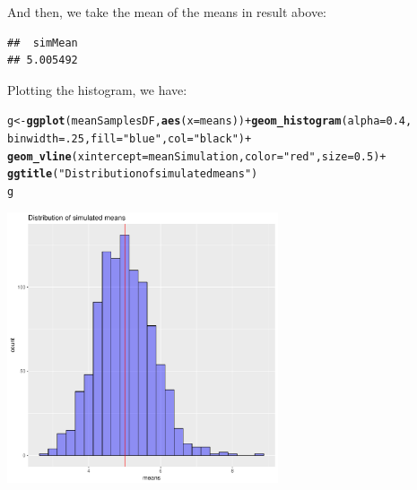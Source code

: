 \documentclass[a4paper, 12pt]{article}\usepackage[]{graphicx}\usepackage[]{color}
\makeatletter
\newcommand{\hlnum}[1]{\textcolor[rgb]{0.686,0.059,0.569}{#1}}%
\newcommand{\hlstr}[1]{\textcolor[rgb]{0.192,0.494,0.8}{#1}}%
\newcommand{\hlopt}[1]{\textcolor[rgb]{0,0,0}{#1}}%
\newcommand{\hlstd}[1]{\textcolor[rgb]{0.345,0.345,0.345}{#1}}%
\newcommand{\hlkwb}[1]{\textcolor[rgb]{0.69,0.353,0.396}{#1}}%
\newcommand{\hlkwc}[1]{\textcolor[rgb]{0.333,0.667,0.333}{#1}}%
\newcommand{\hlkwd}[1]{\textcolor[rgb]{0.737,0.353,0.396}{\textbf{#1}}}%
\newenvironment{kframe}{%
 \def\at@end@of@kframe{}%
 \ifinner\ifhmode%
  \def\at@end@of@kframe{\end{minipage}}%
  \begin{minipage}{\columnwidth}%
 \fi\fi%
 \def\FrameCommand##1{\hskip\@totalleftmargin \hskip-\fboxsep
 \colorbox{shadecolor}{##1}\hskip-\fboxsep
     \hskip-\linewidth \hskip-\@totalleftmargin \hskip\columnwidth}%
 \MakeFramed {\advance\hsize-\width
   \@totalleftmargin\z@ \linewidth\hsize
   \@setminipage}}%
 {\par\unskip\endMakeFramed%
 \at@end@of@kframe}
\newenvironment{knitrout}{}{} %
\makeatother
\begin{document}
        And then, we take the mean of the means in result above:
\begin{knitrout}\small
{}\color{fgcolor}\begin{kframe}
\begin{verbatim}
##  simMean 
## 5.005492
\end{verbatim}
\end{kframe}
\end{knitrout}
        Plotting the histogram, we have:
\begin{knitrout}
\color{fgcolor}\begin{kframe}
\begin{alltt}
\hlstd{g}\hlkwb{<-} \hlkwd{ggplot}\hlstd{(meanSamplesDF,}\hlkwd{aes}\hlstd{(}\hlkwc{x} \hlstd{= means) )} \hlopt{+} \hlkwd{geom_histogram}\hlstd{(}\hlkwc{alpha}\hlstd{=}\hlnum{0.4}\hlstd{,}
                        \hlkwc{binwidth}\hlstd{=} \hlnum{.25}\hlstd{,} \hlkwc{fill} \hlstd{=} \hlstr{"blue"}\hlstd{,} \hlkwc{col} \hlstd{=} \hlstr{"black"}\hlstd{)} \hlopt{+}
  \hlkwd{geom_vline}\hlstd{(}\hlkwc{xintercept} \hlstd{= meanSimulation,} \hlkwc{color}\hlstd{=}\hlstr{"red"}\hlstd{,} \hlkwc{size} \hlstd{=} \hlnum{0.5}\hlstd{)} \hlopt{+}
  \hlkwd{ggtitle}\hlstd{(}\hlstr{"Distribution of simulated means"}\hlstd{)}
\hlstd{g}
\end{alltt}
\end{kframe}

{\centering \includegraphics[width=8cm,height=8cm]{figure/plotHistogram-1} 

}



\end{knitrout}
        
\end{document}
